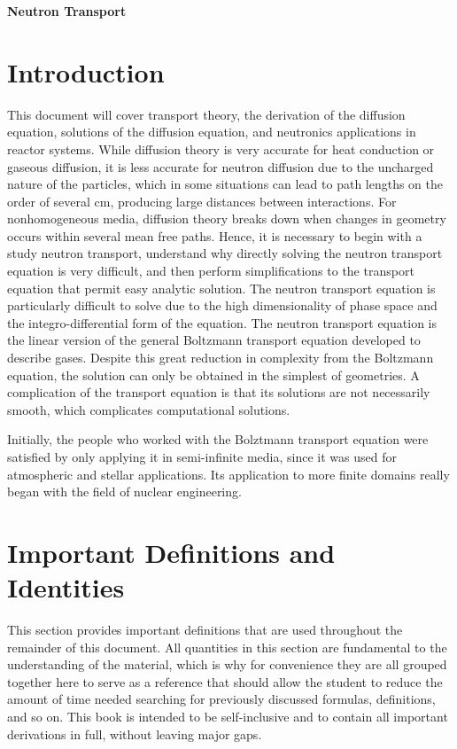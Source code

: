 \documentclass[10pt]{article}
\begin{document}
\begin{centering}
\textbf{\Large Neutron Transport}\\
\end{centering}

\tableofcontents
\clearpage

\section{Introduction}
\begin{flushleft}\justify

This document will cover transport theory, the derivation of the diffusion equation, solutions of the diffusion equation, and neutronics applications in reactor systems. While diffusion theory is very accurate for heat conduction or gaseous diffusion, it is less accurate for neutron diffusion due to the uncharged nature of the particles, which in some situations can lead to path lengths on the order of several cm, producing large distances between interactions. For nonhomogeneous media, diffusion theory breaks down when changes in geometry occurs within several mean free paths. Hence, it is necessary to begin with a study neutron transport, understand why directly solving the neutron transport equation is very difficult, and then perform simplifications to the transport equation that permit easy analytic solution. The neutron transport equation is particularly difficult to solve due to the high dimensionality of phase space and the integro-differential form of the equation. The neutron transport equation is the linear version of the general Boltzmann transport equation developed to describe gases. Despite this great reduction in complexity from the Boltzmann equation, the solution can only be obtained in the simplest of geometries. A complication of the transport equation is that its solutions are not necessarily smooth, which complicates computational solutions. 

Initially, the people who worked with the Bolztmann transport equation were satisfied by only applying it in semi-infinite media, since it was used for atmospheric and stellar applications. Its application to more finite domains really began with the field of nuclear engineering. 

\section{Important Definitions and Identities}

This section provides important definitions that are used throughout the remainder of this document. All quantities in this section are fundamental to the understanding of the material, which is why for convenience they are all grouped together here to serve as a reference that should allow the student to reduce the amount of time needed searching for previously discussed formulas, definitions, and so on. This book is intended to be self-inclusive and to contain all important derivations in full, without leaving major gaps.


\end{flushleft}
\end{document}
